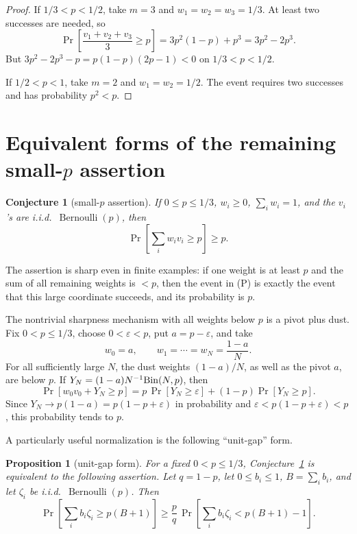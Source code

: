 \documentclass[12pt]{article}
\newtheorem{proposition}{Proposition}
\newtheorem{conjecture}{Conjecture}
\newcommand{\Ber}{\operatorname{Bernoulli}}
\begin{document}
\begin{proof}
If \(1/3<p<1/2\), take \(m=3\) and \(w_1=w_2=w_3=1/3\).  At least two
successes are needed, so
\[
\Pr\!\left[\frac{v_1+v_2+v_3}{3}\ge p\right]
  =3p^2(1-p)+p^3
  =3p^2-2p^3 .
\]
But \(3p^2-2p^3-p=p(1-p)(2p-1)<0\) on \(1/3<p<1/2\).

If \(1/2<p<1\), take \(m=2\) and \(w_1=w_2=1/2\).  The event requires two
successes and has probability \(p^2<p\).
\end{proof}

\section*{Equivalent forms of the remaining small-\(p\) assertion}

\begin{conjecture}[small-\(p\) assertion]\label{conj:missing}
If \(0\le p\le1/3\), \(w_i\ge0\), \(\sum_iw_i=1\), and the \(v_i\)'s are
i.i.d.\ \(\Ber(p)\), then
\[
   \Pr\!\left[\sum_i w_i v_i\ge p\right]\ge p .
\]
\end{conjecture}

The assertion is sharp even in finite examples: if one weight is at least \(p\) and
the sum of all remaining weights is \(<p\), then the event in (P) is exactly
the event that this large coordinate succeeds, and its probability is \(p\).

The nontrivial sharpness mechanism with all weights below \(p\) is a pivot plus
dust.  Fix \(0<p\le1/3\), choose \(0<\varepsilon<p\), put
\(a=p-\varepsilon\), and take
\[
   w_0=a,\qquad
   w_1=\cdots=w_N=\frac{1-a}{N}.
\]
For all sufficiently large \(N\), the dust weights \((1-a)/N\), as well as the
pivot \(a\), are below \(p\).
If \(Y_N=(1-a)N^{-1}{\rm Bin}(N,p)\), then
\[
 \Pr\!\left[w_0v_0+Y_N\ge p\right]
 =
 p\,\Pr[Y_N\ge\varepsilon]+(1-p)\Pr[Y_N\ge p].
\]
Since \(Y_N\to p(1-a)=p(1-p+\varepsilon)\) in probability and
\(\varepsilon<p(1-p+\varepsilon)<p\), this probability tends to \(p\).

A particularly useful normalization is the following ``unit-gap'' form.

\begin{proposition}[unit-gap form]\label{prop:unitgap}
For a fixed \(0<p\le1/3\), Conjecture~\ref{conj:missing} is equivalent to the
following assertion.  Let \(q=1-p\), let \(0\le b_i\le1\),
\(B=\sum_i b_i\), and let \(\zeta_i\) be i.i.d.\ \(\Ber(p)\).  Then
\[
 \Pr\!\left[\sum_i b_i\zeta_i\ge p(B+1)\right]
 \ge
 \frac{p}{q}\,
 \Pr\!\left[\sum_i b_i\zeta_i<p(B+1)-1\right].            \tag{UG}
\]
\end{proposition}
\end{document}
